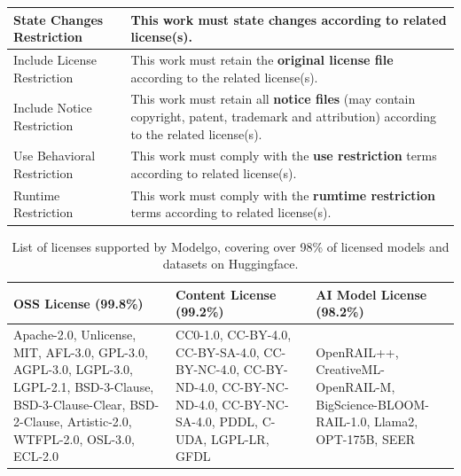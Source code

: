 \begin{table}[t]
\begin{tabular}{|p{3.3cm}|p{4.3cm}|}
    State Changes Restriction & This work must \textbf{state changes} according to related license(s). \\ \hline
    Include License Restriction & This work must retain the \textbf{original license file} according to the related license(s). \\ \hline
    Include Notice Restriction & This work must retain all \textbf{notice files} (may contain copyright, patent, trademark and attribution) according to the related license(s). \\ \hline
    Use Behavioral Restriction & This work must comply with the \textbf{use restriction} terms according to related license(s). \\ \hline
    Runtime Restriction & This work must comply with the \textbf{rumtime restriction} terms according to related license(s). \\ \hline

    \end{tabular}
\end{table}

\begin{table}[t]
    \caption{List of licenses supported by Modelgo, covering over 98\% of licensed models and datasets on Huggingface.}
    \scriptsize
    \label{tab:list}
    \begin{tabular}{|p{2.45cm}|p{2.45cm}|p{2.45cm}|}
    \hline
    \rowcolor[gray]{.8}
    \textbf{OSS License} (99.8\%) & \textbf{Content License} (99.2\%) & \textbf{AI Model License} (98.2\%)\\ \hline
    Apache-2.0, Unlicense, MIT, AFL-3.0, GPL-3.0, AGPL-3.0, LGPL-3.0, LGPL-2.1, BSD-3-Clause, BSD-3-Clause-Clear, BSD-2-Clause, Artistic-2.0, WTFPL-2.0, OSL-3.0, ECL-2.0
    &
    CC0-1.0, CC-BY-4.0, CC-BY-SA-4.0, CC-BY-NC-4.0, CC-BY-ND-4.0, CC-BY-NC-ND-4.0, CC-BY-NC-SA-4.0, PDDL, C-UDA, LGPL-LR, GFDL
    & 
    OpenRAIL++, CreativeML-OpenRAIL-M, BigScience-BLOOM-RAIL-1.0, Llama2, OPT-175B, SEER
    \\ \hline

    \end{tabular}
\end{table}


